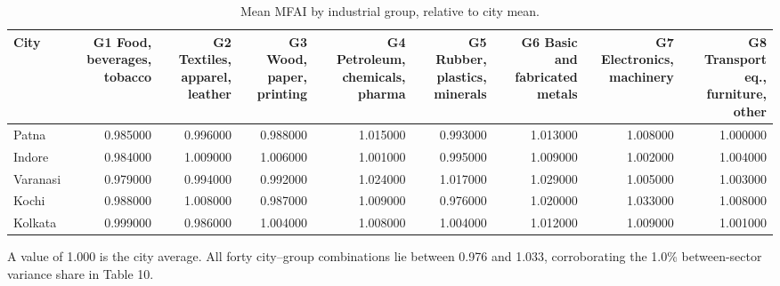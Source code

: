 \begin{table}[htbp]
\centering
\small
\caption{Mean MFAI by industrial group, relative to city mean.}
\label{tab:s4b_group_relative}
\begin{tabular}{lrrrrrrrr}
\toprule
City & G1 Food, beverages, tobacco & G2 Textiles, apparel, leather & G3 Wood, paper, printing & G4 Petroleum, chemicals, pharma & G5 Rubber, plastics, minerals & G6 Basic and fabricated metals & G7 Electronics, machinery & G8 Transport eq., furniture, other \\
\midrule
Patna & 0.985000 & 0.996000 & 0.988000 & 1.015000 & 0.993000 & 1.013000 & 1.008000 & 1.000000 \\
Indore & 0.984000 & 1.009000 & 1.006000 & 1.001000 & 0.995000 & 1.009000 & 1.002000 & 1.004000 \\
Varanasi & 0.979000 & 0.994000 & 0.992000 & 1.024000 & 1.017000 & 1.029000 & 1.005000 & 1.003000 \\
Kochi & 0.988000 & 1.008000 & 0.987000 & 1.009000 & 0.976000 & 1.020000 & 1.033000 & 1.008000 \\
Kolkata & 0.999000 & 0.986000 & 1.004000 & 1.008000 & 1.004000 & 1.012000 & 1.009000 & 1.001000 \\
\bottomrule
\end{tabular}
\begin{tablenotes}\footnotesize
\item A value of 1.000 is the city average. All forty city–group combinations lie between 0.976 and 1.033, corroborating the 1.0\% between-sector variance share in Table 10.
\end{tablenotes}
\end{table}
